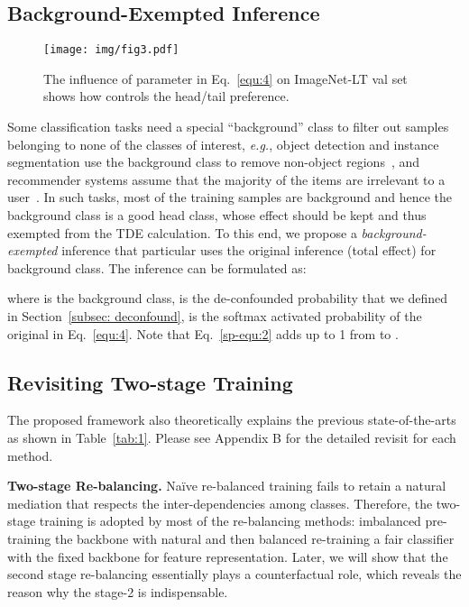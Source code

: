 \documentclass{article}
\newcommand{\eg}{\textit{e.g.}}
\begin{document}
\subsection{Background-Exempted Inference}
\label{subsec: bgfixtde}
\begin{wrapfigure}{r}{6cm}
   \texttt{[image: img/fig3.pdf]}
   \vspace{-3mm}
   \caption{The influence of parameter  in Eq.~\eqref{equ:4} on ImageNet-LT val set~\cite{liu2019large} shows how  controls the head/tail preference.}
   \label{fig:3} \vspace{-5mm}
\end{wrapfigure}
Some classification tasks need a special ``background'' class to filter out samples belonging to none of the classes of interest, \eg, object detection and instance segmentation use the background class to remove non-object regions~\cite{ren2015faster, cai2018cascade}, and recommender systems assume that the majority of the items are irrelevant to a user~\cite{rendle2012bpr}. In such tasks, most of the training samples are background and hence the background class is a good head class, whose effect should be kept and thus exempted from the TDE calculation. To this end, we propose a \emph{background-exempted} inference that particular uses the original inference (total effect) for background class. The inference can be formulated as:

where  is the background class,  is the de-confounded probability that we defined in Section~\ref{subsec: deconfound},  is the softmax activated probability of the original  in Eq.~\eqref{equ:4}. Note that Eq.~\eqref{sp-equ:2} adds up to 1 from  to .


\subsection{Revisiting Two-stage Training}
\label{subsec: revisiting}
The proposed framework also theoretically explains the previous state-of-the-arts as shown in Table~\ref{tab:1}. Please see Appendix B for the detailed revisit for each method.


\textbf{Two-stage Re-balancing.}  Na\"ive re-balanced training fails to retain a natural mediation  that respects the inter-dependencies among classes. Therefore, the two-stage training is adopted by most of the re-balancing methods: imbalanced pre-training the backbone with natural  and then balanced re-training a fair classifier with the fixed backbone for feature representation. Later, we will show that the second stage re-balancing essentially plays a counterfactual role, which reveals the reason why the stage-2 is indispensable.
\end{document}
